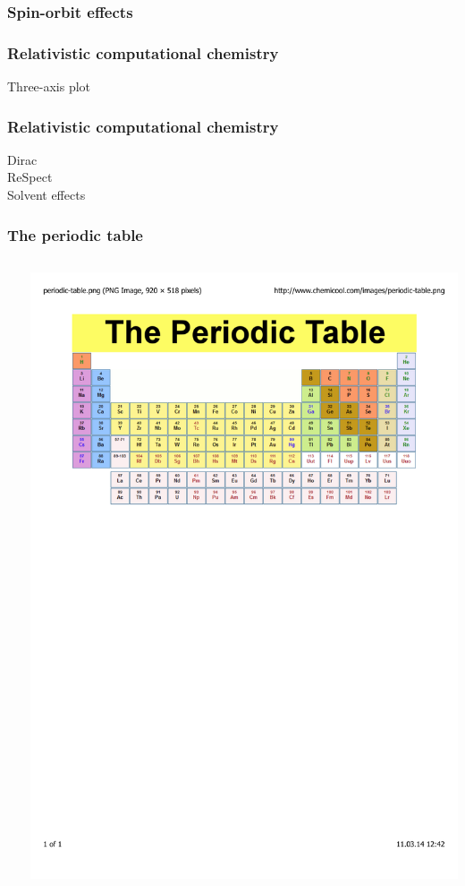 \documentclass[mathserif,10pt]{beamer}
\begin{document}
\begin{frame}
    \frametitle{Spin-orbit effects}
\end{frame}

\begin{frame}
    \frametitle{Relativistic computational chemistry}
    Three-axis plot
\end{frame}

\begin{frame}
    \frametitle{Relativistic computational chemistry}
    Dirac\\
    ReSpect\\
    Solvent effects
\end{frame}

\begin{frame}
    \frametitle{The periodic table}
    \begin{columns}
    \begin{column}{.40\textwidth}
	\ \\
    \end{column}
    \begin{column}{.60\textwidth}
	\centering
	\includegraphics[viewport = 0 500 550 800, clip, scale=0.3]{figures/periodic_table.pdf}
    \end{column}
    \end{columns}
\end{frame}
\end{document}
